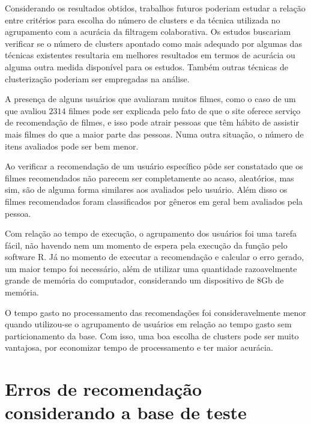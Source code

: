 \documentclass[12pt,a4paper,header]{abnt}
\begin{document}
Considerando os resultados obtidos, trabalhos futuros poderiam estudar a relação entre critérios para escolha do número de clusters e da técnica utilizada no agrupamento com a acurácia da filtragem colaborativa. Os estudos buscariam verificar se o número de clusters apontado como mais adequado por algumas das técnicas existentes resultaria em melhores resultados em termos de acurácia ou alguma outra medida disponível para os estudos. Também outras técnicas de clusterização poderiam ser empregadas na análise.

A presença de alguns usuários que avaliaram muitos filmes, como o caso de um que avaliou $2314$ filmes pode ser explicada pelo fato de que o site oferece serviço de recomendação de filmes, e isso pode atrair pessoas que têm hábito de assistir mais filmes do que a maior parte das pessoas. Numa outra situação, o número de itens avaliados pode ser bem menor.

Ao verificar a recomendação de um usuário específico pôde ser constatado que os filmes recomendados não parecem ser completamente ao acaso, aleatórios, mas sim, são de alguma forma similares aos avaliados pelo usuário. Além disso os filmes recomendados foram classificados por gêneros em geral bem avaliados pela pessoa.

Com relação ao tempo de execução, o agrupamento dos usuários foi uma tarefa fácil, não havendo nem um momento de espera pela execução da função pelo software R. Já no momento de executar a recomendação e calcular o erro gerado, um maior tempo foi necessário, além de utilizar uma quantidade razoavelmente grande de memória do computador, considerando um dispositivo de $8$Gb de memória.

O tempo gasto no processamento das recomendações foi consideravelmente menor quando utilizou-se o agrupamento de usuários em relação ao tempo gasto sem particionamento da base. Com isso, uma boa escolha de clusters pode ser muito vantajosa, por economizar tempo de processamento e ter maior acurácia.




\anexo

\chapter{Erros de recomendação considerando a base de teste}
\label{anexo_tabela}
\end{document}
